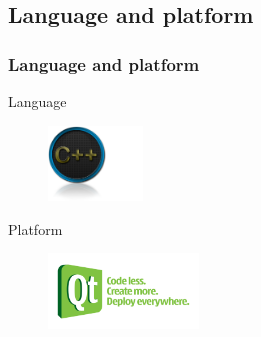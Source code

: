 \documentclass[12pt]{beamer}
\begin{document}
\subsection{Language and platform}
\begin{frame}
\frametitle{Language and platform}
\begin{block}{Language}

\begin{figure}
   \includegraphics[height= 2cm]{images/c++.png}
\end{figure}

\end{block}

\begin{block}{Platform}

\begin{figure}
   \includegraphics[height= 2cm]{images/qt.png}
\end{figure}

\end{block}

\end{frame}
\end{document}
